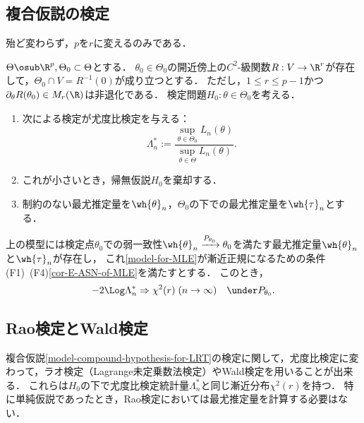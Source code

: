 \documentclass[uplatex,dvipdfmx]{jsreport}
\begin{document}
\subsection{複合仮説の検定}

\begin{tcolorbox}[colframe=ForestGreen, colback=ForestGreen!10!white,breakable,colbacktitle=ForestGreen!40!white,coltitle=black,fonttitle=\bfseries\sffamily,
title=]
    殆ど変わらず，$p$を$r$に変えるのみである．
\end{tcolorbox}

\begin{model}[複合仮説の尤度比検定]\label{model-compound-hypothesis-for-LRT}
    $\Theta\osub\R^p,\Theta_0\subset\Theta$とする．
    $\theta_0\in\Theta_0$の開近傍上の$C^2$-級関数$R:V\to\R^r$が存在して，$\Theta_0\cap V=R^{-1}(0)$が成り立つとする．
    ただし，$1\le r\le p-1$かつ$\partial_\theta R(\theta_0)\in M_r(\R)$は非退化である．
    検定問題$H_0:\theta\in\Theta_0$を考える．
    \begin{enumerate}
        \item 次による検定が尤度比検定を与える：
        \[\Lambda^*_n:=\frac{\sup_{\theta\in\Theta_0}L_n(\theta)}{\sup_{\theta\in\Theta}L_n(\theta)}.\]
        \item これが小さいとき，帰無仮説$H_0$を棄却する．
        \item 制約のない最尤推定量を$\wh{\theta}_n$，$\Theta_0$の下での最尤推定量を$\wh{\tau}_n$とする．
    \end{enumerate}
\end{model}

\begin{theorem}
    上の模型には検定点$\theta_0$での弱一致性$\wh{\theta}_n\xrightarrow{P_{\theta_0}}\theta_0$を満たす最尤推定量$\wh{\theta}_n$と$\wh{\tau}_n$が存在し，
    これ\ref{model-for-MLE}が漸近正規になるための条件(F1)~(F4)\ref{cor-E-ASN-of-MLE}を満たすとする．
    このとき，
    \[-2\Log\Lambda^*_n\Rightarrow\chi^2(r)\;(n\to\infty)\quad\under P_{\theta_0}.\]
\end{theorem}

\subsection{Rao検定とWald検定}

\begin{tcolorbox}[colframe=ForestGreen, colback=ForestGreen!10!white,breakable,colbacktitle=ForestGreen!40!white,coltitle=black,fonttitle=\bfseries\sffamily,
title=]
    複合仮説\ref{model-compound-hypothesis-for-LRT}の検定に関して，尤度比検定に変わって，ラオ検定（Lagrange未定乗数法検定）やWald検定を用いることが出来る．
    これらは$H_0$の下で尤度比検定統計量$\Lambda_n^*$と同じ漸近分布$\chi^2(r)$を持つ．
    特に単純仮説であったとき，Rao検定においては最尤推定量を計算する必要はない．
\end{tcolorbox}
\end{document}
